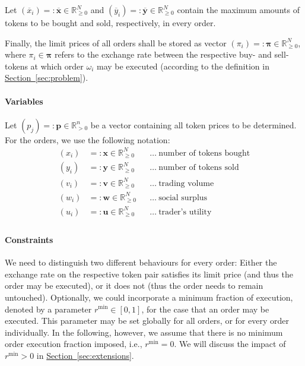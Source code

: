 \documentclass[11pt,parskip=full]{scrartcl}%
\newcommand*{\ie}{i.e., }
\newcommand*{\Min}{\mathrm{min}}
\newcommand*{\secref}[1]{\hyperref[{#1}]{Section~\ref*{#1}}}
\newcommand*{\subsecref}[1]{\hyperref[{#1}]{Section~\ref*{#1}}}
\begin{document}
Let $ (\overline{x}_i) =: \overline{\mathbf{x}} \in \mathbb{R}^N_{\ge 0} $ and 
$ (\overline{y}_i) =: \overline{\mathbf{y}} \in \mathbb{R}^N_{\ge 0} $ contain the maximum amounts
of tokens to be bought and sold, respectively, in every order.

Finally, the limit prices of all orders shall be stored as vector
$ (\pi_i) =: \bm{\pi} \in \mathbb{R}^N_{\ge 0} $, where $ \pi_i \in \bm{\pi} $ refers to the
exchange rate between the respective buy- and sell-tokens at which order $ \omega_i $ may be
executed (according to the definition in \subsecref{sec:problem}).

\vspace{-.2cm}
\paragraph{Variables}

Let $(p_j) =: \mathbf{p} \in \mathbb{R}^n_{> 0}$ be a vector containing all token prices to be determined.
For the orders, we use the following notation:
\begin{align*}
  (x_i) &=: \mathbf{x} \in \mathbb{R}^N_{\ge 0} && \ldots\>\text{number of tokens bought}\\
  (y_i) &=: \mathbf{y} \in \mathbb{R}^N_{\ge 0} && \ldots\>\text{number of tokens sold}\\[2mm]
  (v_i) &=: \mathbf{v} \in \mathbb{R}^N_{\ge 0} && \ldots\>\text{trading volume}\\
  (w_i) &=: \mathbf{w} \in \mathbb{R}^N_{\ge 0} && \ldots\>\text{social surplus}\\
  (u_i) &=: \mathbf{u} \in \mathbb{R}^N_{\ge 0} && \ldots\>\text{trader's utility}\\
\end{align*}


\paragraph{Constraints}

We need to distinguish two different behaviours for every order: Either the exchange rate
on the respective token pair satisfies its limit price (and thus the order may be executed), or it
does not (thus the order needs to remain untouched).
Optionally, we could incorporate a minimum fraction of execution, denoted by a parameter
$r^\Min \in [0,1]$, for the case that an order may be executed.
This parameter may be set globally for all orders, or for every order individually.
In the following, however, we assume that there is no minimum order execution fraction imposed,
\ie $r^\Min = 0$.
We will discuss the impact of $r^\Min>0$ in \secref{sec:extensions}.
\end{document}
